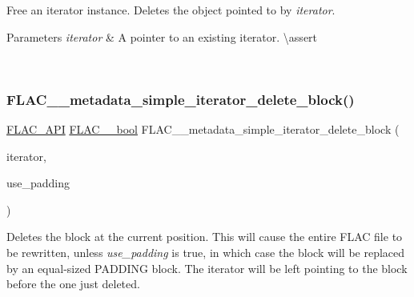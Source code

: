 Free an iterator instance. Deletes the object pointed to by {\itshape iterator}.


\begin{DoxyParams}{Parameters}
{\em iterator} & A pointer to an existing iterator. \textbackslash{}assert 
\begin{DoxyCode}{1}
\end{DoxyCode}
 \\
\hline
\end{DoxyParams}
\mbox{\label{group__flac__metadata__level1_gaf0a1823f95f8097f0d2ff3f67ae30a88}} 
\subsubsection{\texorpdfstring{FLAC\_\_metadata\_simple\_iterator\_delete\_block()}{FLAC\_\_metadata\_simple\_iterator\_delete\_block()}}
{\footnotesize\ttfamily \mbox{\hyperlink{group__flac__export_ga56ca07df8a23310707732b1c0007d6f5}{F\+L\+A\+C\+\_\+\+A\+PI}} \mbox{\hyperlink{ordinals_8h_a95103469f1cbd78b8cf250194985b34e}{F\+L\+A\+C\+\_\+\+\_\+bool}} F\+L\+A\+C\+\_\+\+\_\+metadata\+\_\+simple\+\_\+iterator\+\_\+delete\+\_\+block (\begin{DoxyParamCaption}\item[{\mbox{\hyperlink{group__flac__metadata__level1_ga6accccddbb867dfc2eece9ee3ffecb3a}{F\+L\+A\+C\+\_\+\+\_\+\+Metadata\+\_\+\+Simple\+Iterator}} $\ast$}]{iterator,  }\item[{\mbox{\hyperlink{ordinals_8h_a95103469f1cbd78b8cf250194985b34e}{F\+L\+A\+C\+\_\+\+\_\+bool}}}]{use\+\_\+padding }\end{DoxyParamCaption})}

Deletes the block at the current position. This will cause the entire F\+L\+AC file to be rewritten, unless {\itshape use\+\_\+padding} is {\ttfamily true}, in which case the block will be replaced by an equal-\/sized P\+A\+D\+D\+I\+NG block. The iterator will be left pointing to the block before the one just deleted.

